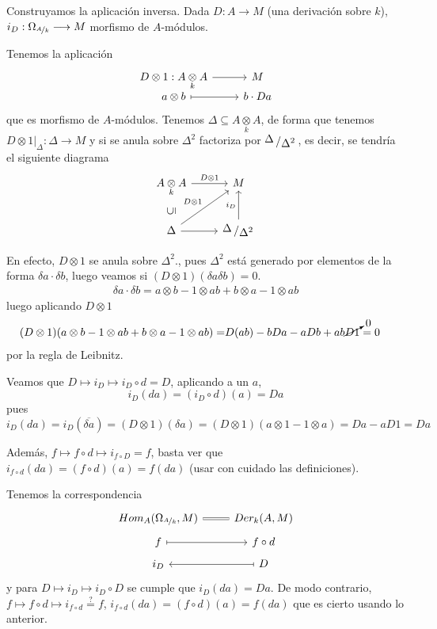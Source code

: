 \begin{dem}
    Construyamos la aplicaci\'on inversa. Dada $D : A \longrightarrow M$ (una derivaci\'on sobre $k$), $i_D : \Omega_{\nicefrac{A}{k}} \longrightarrow M$ morfismo de $A$-m\'odulos. 

    Tenemos la aplicaci\'on
    $$\bt D\otimes 1: A\underset{k}{\otimes} A \rar & M \\[-8mm] a\otimes b \rarmaps & b \cdot Da \et $$
    que es morfismo de $A$-m\'odulos. Tenemos $\Delta \subseteq  A\underset{k}{\otimes} A$, de forma que tenemos $D\otimes 1|_{\Delta} : \Delta \longrightarrow M$ y si se anula sobre $\Delta^2$ factoriza por $\modulo{\Delta}{\Delta^2}$, es decir, se tendr\'ia el siguiente diagrama
    $$\bt  A\underset{k}{\otimes} A \rar{D\otimes 1} & M \\ \Delta \arrow[ u , phantom,  "\rotatebox{90}{$\subseteq$}"] \arrow{ur}{D\otimes 1} \arrow{r} & \modulo{\Delta}{\Delta^2} \arrow{u}{i_D} \et$$
    
    
    En efecto, $D\otimes 1$ se anula sobre $\Delta^2$., pues $\Delta^2$ est\'a generado por elementos de la forma $\delta a \cdot \delta b$, luego veamos si $(D\otimes 1)(\delta a \delta b) =0$.
    \begin{align*}
        \delta a \cdot \delta b = a\otimes b -1 \otimes ab + b \otimes a -1\otimes ab
    \end{align*}
    luego aplicando $D\otimes 1$
    \begin{align*}
        (D\otimes 1)(a\otimes b -1 \otimes ab + b \otimes a -1\otimes ab) = & D(ab) - bDa - aDb + ab\cancelto{0}{D1} = 0
    \end{align*}
    por la regla de Leibnitz.

    Veamos que $D \longmapsto i_D \longmapsto i_D \circ d = D$, aplicando a un $a$,
    $$i_D(da) = (i_D\circ d)(a) = Da$$
    pues 
    $$i_D(da) = i_D(\overline{\delta a}) = (D\otimes 1)(\delta a) = (D\otimes 1)(a\otimes 1 - 1 \otimes a) = Da - aD1 = Da$$

    Adem\'as, $f \longmapsto f\circ d \longmapsto i_{f\circ D} = f$, basta ver que $i_{f\circ d}(da) = (f\circ d)(a) = f(da)$ (usar con cuidado las definiciones). 
\end{dem}

Tenemos la correspondencia
$$\bt Hom_A (\Omega_{\nicefrac{A}{k}}, M )\rar[equal] & Der_k(A,M) \\[-5mm] f \rarmaps&  f\circ d \\[-5mm] i_D & \arrow[mapsto]{l} D \et$$
y para $D \longmapsto i_D \longmapsto i_D \circ D$ se cumple que $i_D(da) = Da$. De modo contrario, $f \longmapsto f\circ d \longmapsto i_{f\circ d} \overset{?}{=}f$, $i_{f\circ d}(da) = (f\circ d)(a) = f(da)$ que es cierto usando lo anterior. 


